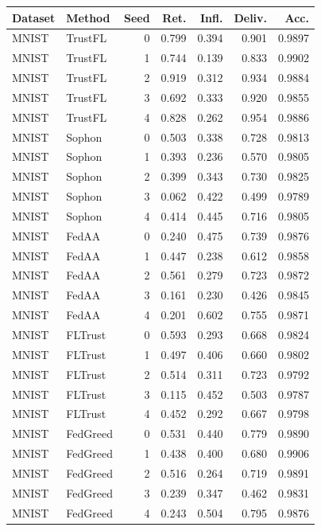 \begin{tabular}{llrrrrr}
\toprule
Dataset & Method & Seed & Ret. & Infl. & Deliv. & Acc. \\
\midrule
MNIST & TrustFL & 0 & 0.799 & 0.394 & 0.901 & 0.9897 \\
MNIST & TrustFL & 1 & 0.744 & 0.139 & 0.833 & 0.9902 \\
MNIST & TrustFL & 2 & 0.919 & 0.312 & 0.934 & 0.9884 \\
MNIST & TrustFL & 3 & 0.692 & 0.333 & 0.920 & 0.9855 \\
MNIST & TrustFL & 4 & 0.828 & 0.262 & 0.954 & 0.9886 \\
MNIST & Sophon & 0 & 0.503 & 0.338 & 0.728 & 0.9813 \\
MNIST & Sophon & 1 & 0.393 & 0.236 & 0.570 & 0.9805 \\
MNIST & Sophon & 2 & 0.399 & 0.343 & 0.730 & 0.9825 \\
MNIST & Sophon & 3 & 0.062 & 0.422 & 0.499 & 0.9789 \\
MNIST & Sophon & 4 & 0.414 & 0.445 & 0.716 & 0.9805 \\
MNIST & FedAA & 0 & 0.240 & 0.475 & 0.739 & 0.9876 \\
MNIST & FedAA & 1 & 0.447 & 0.238 & 0.612 & 0.9858 \\
MNIST & FedAA & 2 & 0.561 & 0.279 & 0.723 & 0.9872 \\
MNIST & FedAA & 3 & 0.161 & 0.230 & 0.426 & 0.9845 \\
MNIST & FedAA & 4 & 0.201 & 0.602 & 0.755 & 0.9871 \\
MNIST & FLTrust & 0 & 0.593 & 0.293 & 0.668 & 0.9824 \\
MNIST & FLTrust & 1 & 0.497 & 0.406 & 0.660 & 0.9802 \\
MNIST & FLTrust & 2 & 0.514 & 0.311 & 0.723 & 0.9792 \\
MNIST & FLTrust & 3 & 0.115 & 0.452 & 0.503 & 0.9787 \\
MNIST & FLTrust & 4 & 0.452 & 0.292 & 0.667 & 0.9798 \\
MNIST & FedGreed & 0 & 0.531 & 0.440 & 0.779 & 0.9890 \\
MNIST & FedGreed & 1 & 0.438 & 0.400 & 0.680 & 0.9906 \\
MNIST & FedGreed & 2 & 0.516 & 0.264 & 0.719 & 0.9891 \\
MNIST & FedGreed & 3 & 0.239 & 0.347 & 0.462 & 0.9831 \\
MNIST & FedGreed & 4 & 0.243 & 0.504 & 0.795 & 0.9876 \\

\end{tabular}
